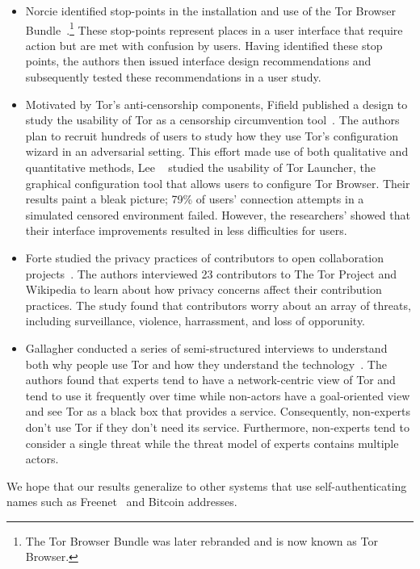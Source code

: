 \begin{itemize}
    \item Norcie \ea identified stop-points in the installation and use
        of the Tor Browser Bundle~\cite{Norcie2014a}.\footnote{The Tor Browser
        Bundle was later rebranded and is now known as Tor Browser.}  These
        stop-points represent places in a user interface that require action
        but are met with confusion by users.  Having identified these stop
        points, the authors then issued interface design recommendations and
        subsequently tested these recommendations in a user study.

    \item Motivated by Tor's anti-censorship components, Fifield \ea published
        a design to study the usability of Tor as a censorship circumvention
        tool~\cite{Fifield2015a}.  The authors plan to recruit hundreds of
        users to study how they use Tor's configuration wizard in an
        adversarial setting.  This effort made use of both qualitative and
        quantitative methods, Lee \ea~\cite{Lee2017a} studied the usability of
        Tor Launcher, the graphical configuration tool that allows users to
        configure Tor Browser.  Their results paint a bleak picture; 79\% of
        users' connection attempts in a simulated censored environment failed.
        However, the researchers' showed that their interface improvements
        resulted in less difficulties for users.

    \item Forte \ea studied the privacy practices of contributors to open
        collaboration projects~\cite{Forte2017a}.  The authors interviewed 23
        contributors to The Tor Project and Wikipedia to learn about how
        privacy concerns affect their contribution practices.  The study found
        that contributors worry about an array of threats, including
        surveillance, violence, harrassment, and loss of opporunity.

    \item Gallagher \ea conducted a series of semi-structured interviews to
        understand both why people use Tor and how they understand the
        technology~\cite{Gallagher2017a}.  The authors found that experts tend
        to have a network-centric view of Tor and tend to use it frequently over
        time while non-actors have a goal-oriented view and see Tor as a black
        box that provides a service.  Consequently, non-experts don't use Tor if
        they don't need its service.  Furthermore, non-experts tend to consider
        a single threat while the threat model of experts contains multiple
        actors.

\end{itemize}

We hope that our results generalize to other systems that use
self-authenticating names such as Freenet~\cite{Freenet} and Bitcoin addresses.

